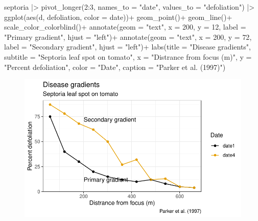 \documentclass[
  letterpaper,
  DIV=11,
  numbers=noendperiod]{scrreprt}
\newenvironment{Shaded}{\begin{snugshade}}{\end{snugshade}}
\newcommand{\AttributeTok}[1]{\textcolor[rgb]{0.40,0.45,0.13}{#1}}
\newcommand{\DecValTok}[1]{\textcolor[rgb]{0.68,0.00,0.00}{#1}}
\newcommand{\FunctionTok}[1]{\textcolor[rgb]{0.28,0.35,0.67}{#1}}
\newcommand{\NormalTok}[1]{\textcolor[rgb]{0.00,0.23,0.31}{#1}}
\newcommand{\SpecialCharTok}[1]{\textcolor[rgb]{0.37,0.37,0.37}{#1}}
\newcommand{\StringTok}[1]{\textcolor[rgb]{0.13,0.47,0.30}{#1}}
\begin{document}
\begin{Shaded}
\begin{Highlighting}[]
\NormalTok{septoria }\SpecialCharTok{|\textgreater{}} 
  \FunctionTok{pivot\_longer}\NormalTok{(}\DecValTok{2}\SpecialCharTok{:}\DecValTok{3}\NormalTok{, }\AttributeTok{names\_to =} \StringTok{"date"}\NormalTok{, }
               \AttributeTok{values\_to =} \StringTok{"defoliation"}\NormalTok{) }\SpecialCharTok{|\textgreater{}} 
  \FunctionTok{ggplot}\NormalTok{(}\FunctionTok{aes}\NormalTok{(d, defoliation, }\AttributeTok{color =}\NormalTok{ date))}\SpecialCharTok{+}
  \FunctionTok{geom\_point}\NormalTok{()}\SpecialCharTok{+}
  \FunctionTok{geom\_line}\NormalTok{()}\SpecialCharTok{+}
  \FunctionTok{scale\_color\_colorblind}\NormalTok{()}\SpecialCharTok{+}
  \FunctionTok{annotate}\NormalTok{(}\AttributeTok{geom =} \StringTok{"text"}\NormalTok{, }\AttributeTok{x =} \DecValTok{200}\NormalTok{, }\AttributeTok{y =} \DecValTok{12}\NormalTok{, }
           \AttributeTok{label =} \StringTok{"Primary gradient"}\NormalTok{, }\AttributeTok{hjust =} \StringTok{"left"}\NormalTok{)}\SpecialCharTok{+}
   \FunctionTok{annotate}\NormalTok{(}\AttributeTok{geom =} \StringTok{"text"}\NormalTok{, }\AttributeTok{x =} \DecValTok{200}\NormalTok{, }\AttributeTok{y =} \DecValTok{72}\NormalTok{, }
           \AttributeTok{label =} \StringTok{"Secondary gradient"}\NormalTok{, }\AttributeTok{hjust =} \StringTok{"left"}\NormalTok{)}\SpecialCharTok{+}
  \FunctionTok{labs}\NormalTok{(}\AttributeTok{title =} \StringTok{"Disease gradients"}\NormalTok{,}
       \AttributeTok{subtitle =} \StringTok{"Septoria leaf spot on tomato"}\NormalTok{,}
       \AttributeTok{x =} \StringTok{"Distrance from focus (m)"}\NormalTok{,}
       \AttributeTok{y =} \StringTok{"Percent defoliation"}\NormalTok{,}
       \AttributeTok{color =} \StringTok{"Date"}\NormalTok{,}
       \AttributeTok{caption =} \StringTok{"Parker et al. (1997)"}\NormalTok{)}
\end{Highlighting}
\end{Shaded}

\begin{figure}[H]

{\centering \includegraphics{./spatial-gradients_files/figure-pdf/unnamed-chunk-10-1.pdf}

}

\end{figure}
\end{document}
